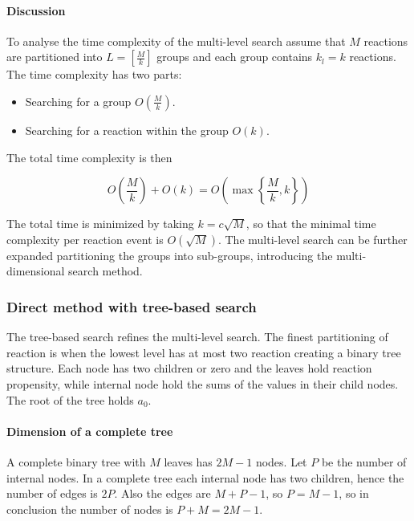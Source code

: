       

      \paragraph{Discussion}
      To analyse the time complexity of the multi-level search assume that $M$ reactions are partitioned into $L = \left[\frac{M}{k}\right]$ groups and each group contains $k_l=k$ reactions.
      The time complexity has two parts:

      \begin{multicols}{2}
        \begin{itemize}
          \item Searching for a group $O\left(\frac{M}{k}\right)$.
          \item Searching for a reaction within the group $O(k)$.
        \end{itemize}
      \end{multicols}

      The total time complexity is then

      $$O\left(\frac{M}{k}\right) + O(k) = O\left(\max\left\{\frac{M}{k}, k\right\}\right)$$

      The total time is minimized by taking $k = c\sqrt{M}$, so that the minimal time complexity per reaction event is $O(\sqrt{M})$.
      The multi-level search can be further expanded partitioning the groups into sub-groups, introducing the multi-dimensional search method.

    \subsubsection{Direct method with tree-based search}
    The tree-based search refines the multi-level search.
    The finest partitioning of reaction is when the lowest level has at most two reaction creating a binary tree structure.
    Each node has two children or zero and the leaves hold reaction propensity, while internal node hold the sums of the values in their child nodes.
    The root of the tree holds $a_0$.

      \paragraph{Dimension of a complete tree}
      A complete binary tree with $M$ leaves has $2M-1$ nodes.
      Let $P$ be the number of internal nodes.
      In a complete tree each internal node has two children, hence the number of edges is $2P$.
      Also the edges are $M+P-1$, so $P = M-1$, so in conclusion the number of nodes is $P+M = 2M-1$.

